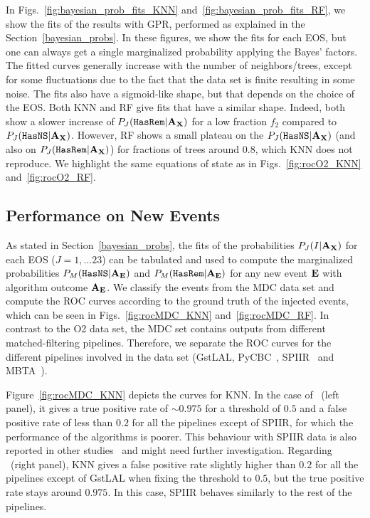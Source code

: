 In Figs.~\ref{fig:bayesian_prob_fits_KNN} and~\ref{fig:bayesian_prob_fits_RF}, 
we show the fits of the results with \ac{GPR},
performed as explained in the Section~\ref{bayesian_probs}. In these figures, we show
the fits for each EOS, but one can always get a single marginalized probability
applying the Bayes' factors. The fitted curves generally increase with the number of neighbors/trees, except for some fluctuations due to the fact that the data set is finite resulting in some noise. The fits also have a
sigmoid-like shape, but that depends on the choice of the EOS. Both \ac{KNN}
and \ac{RF} give fits that have a similar shape. Indeed, both show a slower
increase of $P_J({{\tt HasRem}} |\bf{A_X})$ for a low fraction $f_2$ compared to $P_J({{\tt HasNS}} |\bf{A_X})$.
However, \ac{RF} shows a small plateau on the $P_J({{\tt HasNS}} |\bf{A_X})$ (and also on
$P_J({{\tt HasRem}} |\bf{A_X})$) for fractions of trees around $0.8$, which 
\ac{KNN} does not reproduce. We highlight the same equations of state as in
Figs.~\ref{fig:rocO2_KNN} and~\ref{fig:rocO2_RF}.

\subsection{Performance on New Events}

As stated in Section~\ref{bayesian_probs}, the fits of the probabilities $P_J(I|{\bf A}_{\bf X})$ for each EOS ($J=1,\dots 23$) can be tabulated and used to compute the marginalized
probabilities $P_M({{\tt HasNS}}|{\bf A}_{\bf E})$ and $P_M({{\tt HasRem}}|{\bf A}_{\bf E})$ for any new event $\bf E$ with algorithm outcome $\bf A_{E}$.  We classify the events from the MDC data set and compute the ROC
curves according to the ground truth of the injected events, which can be seen in Figs.~\ref{fig:rocMDC_KNN} and~\ref{fig:rocMDC_RF}. In contrast to the \ac{O2} data set, the \ac{MDC} set contains
outputs from different matched-filtering pipelines. Therefore, we separate the ROC curves for the different pipelines involved in the data set (GstLAL,  PyCBC~\cite{Usman:2015kfa}, SPIIR~\cite{Chu:2020pjv} and
MBTA~\cite{Adams:2015ulm}). 


Figure~\ref{fig:rocMDC_KNN} depicts the curves for \ac{KNN}.  In the case of
\hasns\ (left panel), it gives a true positive rate of $\sim 0.975$ for a
threshold of $0.5$ and a false positive rate of less than $0.2$ for all the
pipelines except of SPIIR, for which the performance of the algorithms is poorer. This behaviour with SPIIR data is also reported in other studies~\cite{Chaudhary:2023vec} and might need further investigation. Regarding \hasrem\ (right panel), \ac{KNN} gives a
false positive rate slightly higher than $0.2$ for all the pipelines except of
GstLAL when fixing the threshold to $0.5$, but the true positive rate stays
around $0.975$. In this case, SPIIR behaves similarly to the rest of the pipelines. 

